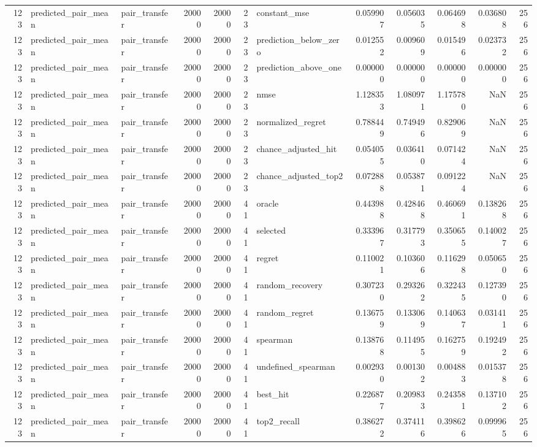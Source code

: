 \begin{tabular}{rllrrrlrrrrr}
123 & predicted_pair_mean & pair_transfer & 20000 & 20000 & 23 & constant_mse & 0.059907 & 0.056035 & 0.064698 & 0.036808 & 256 \\
123 & predicted_pair_mean & pair_transfer & 20000 & 20000 & 23 & prediction_below_zero & 0.012552 & 0.009609 & 0.015496 & 0.023732 & 256 \\
123 & predicted_pair_mean & pair_transfer & 20000 & 20000 & 23 & prediction_above_one & 0.000000 & 0.000000 & 0.000000 & 0.000000 & 256 \\
123 & predicted_pair_mean & pair_transfer & 20000 & 20000 & 23 & nmse & 1.128353 & 1.080971 & 1.175780 & NaN & 256 \\
123 & predicted_pair_mean & pair_transfer & 20000 & 20000 & 23 & normalized_regret & 0.788449 & 0.749496 & 0.829069 & NaN & 256 \\
123 & predicted_pair_mean & pair_transfer & 20000 & 20000 & 23 & chance_adjusted_hit & 0.054055 & 0.036410 & 0.071424 & NaN & 256 \\
123 & predicted_pair_mean & pair_transfer & 20000 & 20000 & 23 & chance_adjusted_top2 & 0.072888 & 0.053871 & 0.091224 & NaN & 256 \\
123 & predicted_pair_mean & pair_transfer & 20000 & 20000 & 41 & oracle & 0.443988 & 0.428468 & 0.460691 & 0.138268 & 256 \\
123 & predicted_pair_mean & pair_transfer & 20000 & 20000 & 41 & selected & 0.333967 & 0.317793 & 0.350655 & 0.140027 & 256 \\
123 & predicted_pair_mean & pair_transfer & 20000 & 20000 & 41 & regret & 0.110021 & 0.103606 & 0.116298 & 0.050650 & 256 \\
123 & predicted_pair_mean & pair_transfer & 20000 & 20000 & 41 & random_recovery & 0.307230 & 0.293262 & 0.322435 & 0.127390 & 256 \\
123 & predicted_pair_mean & pair_transfer & 20000 & 20000 & 41 & random_regret & 0.136759 & 0.133069 & 0.140637 & 0.031411 & 256 \\
123 & predicted_pair_mean & pair_transfer & 20000 & 20000 & 41 & spearman & 0.138768 & 0.114955 & 0.162759 & 0.192492 & 256 \\
123 & predicted_pair_mean & pair_transfer & 20000 & 20000 & 41 & undefined_spearman & 0.002930 & 0.001302 & 0.004883 & 0.015378 & 256 \\
123 & predicted_pair_mean & pair_transfer & 20000 & 20000 & 41 & best_hit & 0.226877 & 0.209833 & 0.243581 & 0.137102 & 256 \\
123 & predicted_pair_mean & pair_transfer & 20000 & 20000 & 41 & top2_recall & 0.386272 & 0.374116 & 0.398626 & 0.099965 & 256 \\

\end{tabular}

